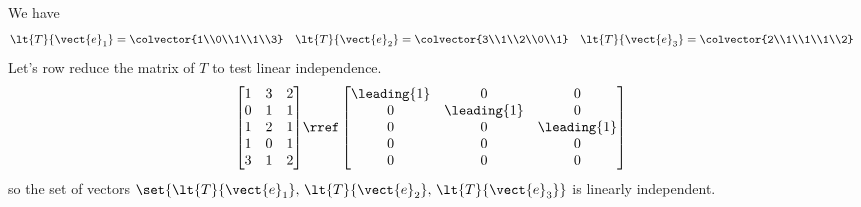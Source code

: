 We have 
%
\begin{align*}
\lt{T}{\vect{e}_1} &= \colvector{1\\0\\1\\1\\3}
&
\lt{T}{\vect{e}_2} &= \colvector{3\\1\\2\\0\\1}
&
\lt{T}{\vect{e}_3} &= \colvector{2\\1\\1\\1\\2}
\end{align*}
%
Let's row reduce the matrix of $T$  to test linear independence.
%
\begin{align*}
\begin{bmatrix} 
1 & 3 & 2\\
0 & 1 & 1\\
1 & 2 & 1\\
1 & 0 & 1\\
3 & 1 & 2
\end{bmatrix} 
&\rref
\begin{bmatrix} 
\leading{1} & 0 & 0\\
0 & \leading{1} & 0\\
0 & 0 & \leading{1} \\
0 & 0 & 0\\
0 & 0 & 0 
\end{bmatrix}
\end{align*}
%
so the set of vectors $\set{\lt{T}{\vect{e}_1},\,\lt{T}{\vect{e}_2},\,\lt{T}{\vect{e}_3}}$ is linearly independent.